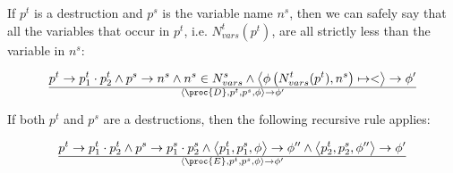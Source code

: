 If $p^t$ is a destruction and $p^s$ is the variable name $n^s$, then we can safely say that
all the variables that occur in $p^t$, i.e. $N_{vars}^t(p^t)$, are all strictly less
than the variable in $n^s$:

\begin{equation}
{
    p^t\rightarrow p^t_1\cdot p^t_2
  \wedge
    p^s\rightarrow n^s
  \wedge
    n^s\in N_{vars}^s
  \wedge
    \left\langle\phi\left(N_{vars}^t(p^t), n^s\right)\mapsto <\right\rangle\rightarrow\phi'
}\over{
  \left\langle\proc{D},p^t,p^s,\phi\right\rangle
  \rightarrow
  \phi'
}
\end{equation}

If both $p^t$ and $p^s$ are a destructions, then the following recursive rule applies:

\begin{equation}
{
    p^t\rightarrow p^t_1\cdot p^t_2
  \wedge
    p^s\rightarrow p^s_1\cdot p^s_2
  \wedge
    \left\langle p^t_1, p^s_1, \phi\right\rangle
    \rightarrow
    \phi''
  \wedge
    \left\langle p^t_2, p^s_2, \phi''\right\rangle
    \rightarrow
    \phi'
}\over{
  \left\langle\proc{E},p^t,p^s,\phi\right\rangle
  \rightarrow
  \phi'
}
\end{equation}
